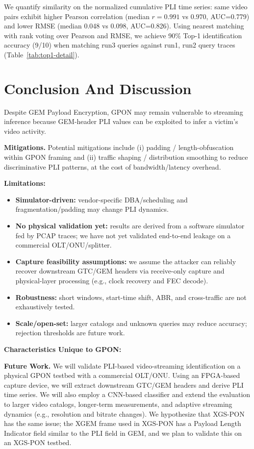 \documentclass[sigconf]{acmart}
\begin{document}
We quantify similarity on the normalized cumulative PLI time series: same video pairs exhibit higher Pearson correlation (median $r=0.991$ vs $0.970$, AUC=0.779) and lower RMSE (median 0.048 vs 0.098, AUC=0.826).
Using nearest matching with rank voting over Pearson and RMSE, we achieve 90\% Top-1 identification accuracy (9/10) when matching run3 queries against run1, run2 query traces (Table~\ref{tab:top1-detail}).

\section{Conclusion And Discussion}
Despite GEM Payload Encryption, GPON may remain vulnerable to streaming inference because GEM-header PLI values can be exploited to infer a victim’s video activity.

\textbf{Mitigations.} Potential mitigations include (i) padding / length-obfuscation within GPON framing and (ii) traffic shaping / distribution smoothing to reduce discriminative PLI patterns, at the cost of bandwidth/latency overhead. 

\textbf{Limitations:} 
\begin{itemize}
  \item \textbf{Simulator-driven:} vendor-specific DBA/scheduling and fragmentation/padding may change PLI dynamics.
  \item \textbf{No physical validation yet:} results are derived from a software simulator fed by PCAP traces; we have not yet validated end-to-end leakage on a commercial OLT/ONU/splitter.
  \item \textbf{Capture feasibility assumptions:} we assume the attacker can reliably recover downstream GTC/GEM headers via receive-only capture and physical-layer processing (e.g., clock recovery and FEC decode).
  \item \textbf{Robustness:} short windows, start-time shift, ABR, and cross-traffic are not exhaustively tested.
  \item \textbf{Scale/open-set:} larger catalogs and unknown queries may reduce accuracy; rejection thresholds are future work.
\end{itemize}

\textbf{Characteristics Unique to GPON:} 


\textbf{Future Work.}
We will validate PLI-based video-streaming identification on a physical GPON testbed with a commercial OLT/ONU. Using an FPGA-based capture device, we will extract downstream GTC/GEM headers and derive PLI time series.
We will also employ a CNN-based classifier and extend the evaluation to larger video catalogs, longer-term measurements, and adaptive streaming dynamics (e.g., resolution and bitrate changes). We hypothesize that XGS-PON has the same issue; the XGEM frame used in XGS-PON has a Payload Length Indicator field similar to the PLI field in GEM, and we plan to validate this on an XGS-PON testbed.



\end{document}
